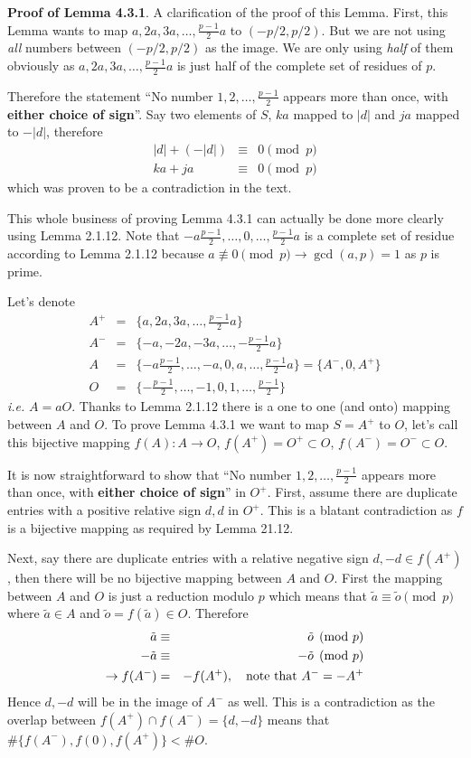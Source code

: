\documentclass[aps,preprint,preprintnumbers,nofootinbib,showpacs,prd]{revtex4-1}
\newcommand{\ie}{{\it i.e.} }
\newcommand{\nbea}{\begin{eqnarray*}}
\newcommand{\neea}{\end{eqnarray*}}
\begin{document}
{\bf Proof of Lemma 4.3.1}. A clarification of the proof of this Lemma. First, this Lemma wants to map $a, 2a, 3a, \dots, \frac{p-1}{2}a$ to $(-p/2, p/2)$. But we are not using {\it all} numbers between $(-p/2, p/2)$ as the image. We are only using {\it half} of them obviously as 
$a, 2a, 3a, \dots, \frac{p-1}{2}a$ is just half of the complete set of residues of $p$.

Therefore the statement ``No number $1, 2, \dots , \frac{p-1}{2}$ appears more than once, with {\bf either choice of sign}''. Say two elements of $S$, $ka$ mapped to $|d|$ and $ja$ mapped to $-|d|$, therefore
%
\nbea
|d| + (-|d|) & \equiv & 0 \pmod{p} \\
ka + ja & \equiv & 0 \pmod{p}
\neea
%
which was proven to be a contradiction in the text.

This whole business of proving Lemma 4.3.1 can actually be done more clearly using Lemma 2.1.12. Note that $-a\frac{p-1}{2}, \dots, 0, \dots, \frac{p-1}{2}a$ is a complete set of residue according to Lemma 2.1.12 because $a \not\equiv 0 \pmod{p} \to \gcd(a,p) = 1$ as $p$ is prime.

Let's denote
%
\nbea
A^+ & = & \{a, 2a, 3a, \dots, \frac{p-1}{2}a\} \\
A^- & = & \{-a, -2a, -3a, \dots, -\frac{p-1}{2}a\} \\
A & = & \{-a\frac{p-1}{2}, \dots, -a, 0, a, \dots, \frac{p-1}{2}a\}  = \{A^-, 0, A^+\}\\
O & = & \{-\frac{p-1}{2}, \dots, -1, 0, 1, \dots, \frac{p-1}{2}\}
\neea
%
\ie $A = aO$. Thanks to Lemma 2.1.12 there is a one to one (and onto) mapping between $A$ and $O$. To prove Lemma 4.3.1 we want to map $S = A^+$ to $O$, let's call this bijective mapping $f(A): A \to O$, $f(A^+) = O^+ \subset O$, $f(A^-) = O^- \subset O$.

It is now straightforward to show that ``No number $1, 2, \dots , \frac{p-1}{2}$ appears more than once, with {\bf either choice of sign}'' in  $O^+$. First, assume there are duplicate entries with a positive relative sign $d, d$ in $O^+$. This is a blatant contradiction as $f$ is a bijective mapping as required by Lemma 21.12. 

Next, say there are duplicate entries with a relative negative sign $d, -d \in f(A^+)$, then there will be no bijective mapping between $A$ and $O$. First the mapping between $A$ and $O$ is just a reduction modulo $p$ which means that $\tilde a \equiv \tilde o \pmod{p}$ where $\tilde a \in A$ and $\tilde o = f(\tilde a) \in O$. Therefore
%
\nbea
\tilde a & \equiv & \tilde o \pmod{p} \\
-\tilde a & \equiv & -\tilde o \pmod{p} \\
\to f(A^-) & = & - f(A^+), ~~~{\rm note~that~} A^- = -A^+
\neea
%
Hence $d, -d$ will be in the image of $A^-$ as well. This is a contradiction as the overlap between $f(A^+) \cap f(A^-) = \{d, -d\}$ means that $\#\{f(A^-), f(0), f(A^+)\} < \#O$.
\end{document}
